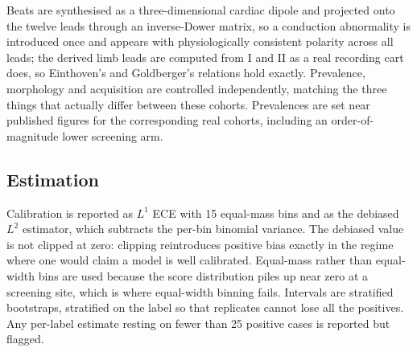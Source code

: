 Beats are synthesised as a three-dimensional cardiac dipole and projected onto
the twelve leads through an inverse-Dower matrix, so a conduction abnormality is
introduced once and appears with physiologically consistent polarity across all
leads; the derived limb leads are computed from I and II as a real recording
cart does, so Einthoven's and Goldberger's relations hold exactly.  Prevalence,
morphology and acquisition are controlled independently, matching the three
things that actually differ between these cohorts.  Prevalences are set near
published figures for the corresponding real cohorts, including an order-of-
magnitude lower screening arm.

\subsection{Estimation}

Calibration is reported as $L^1$ ECE with 15 equal-mass bins and as the
debiased $L^2$ estimator, which subtracts the per-bin binomial variance.  The
debiased value is not clipped at zero: clipping reintroduces positive bias
exactly in the regime where one would claim a model is well calibrated.
Equal-mass rather than equal-width bins are used because the score distribution
piles up near zero at a screening site, which is where equal-width binning
fails.  Intervals are stratified bootstraps, stratified on the label so that
replicates cannot lose all the positives.  Any per-label estimate resting on
fewer than 25 positive cases is reported but flagged.
